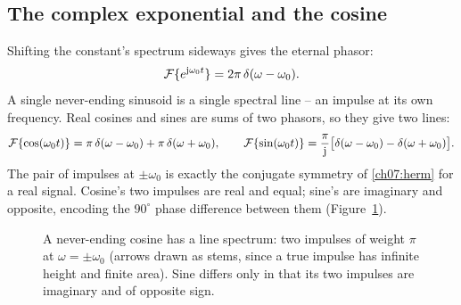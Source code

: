 \subsection{The complex exponential and the cosine}
Shifting the constant's spectrum sideways gives the eternal phasor:
\begin{equation}
\mathcal{F}\{e^{\mathrm{j}\omega_0 t}\} = 2\pi\,\delta(\omega-\omega_0) .
\end{equation}
A single never-ending sinusoid is a single spectral line -- an impulse at its own
frequency. Real cosines and sines are sums of two phasors, so they give two lines:
\begin{equation}
\label{ch07:cos}
\mathcal{F}\{\cos(\omega_0 t)\} = \pi\,\delta(\omega-\omega_0) + \pi\,\delta(\omega+\omega_0),
\qquad
\mathcal{F}\{\sin(\omega_0 t)\} = \frac{\pi}{\mathrm{j}}\big[\delta(\omega-\omega_0) - \delta(\omega+\omega_0)\big].
\end{equation}
The pair of impulses at $\pm\omega_0$ is exactly the conjugate symmetry of
\eqref{ch07:herm} for a real signal. Cosine's two impulses are real and equal; sine's
are imaginary and opposite, encoding the $90^\circ$ phase difference between them
(Figure~\ref{ch07:fig-cosline}).

\begin{figure}[H]
\centering
{}
\caption{A never-ending cosine has a line spectrum: two impulses of weight $\pi$ at
$\omega=\pm\omega_0$ (arrows drawn as stems, since a true impulse has infinite height and
finite area). Sine differs only in that its two impulses are imaginary and of opposite
sign.}
\label{ch07:fig-cosline}
\end{figure}

